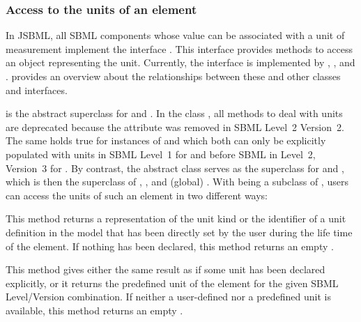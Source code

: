 \subsubsection{Access to the units of an element}

In JSBML, all SBML components whose value can be associated with a unit of
measurement implement the interface \SBaseWithUnit.  This interface provides
methods to access an object representing the unit. Currently, the interface
is implemented by \AbstractNamedSBaseWithUnit, \ExplicitRule, and
\KineticLaw.   provides an overview about the
relationships between these and other classes and interfaces.


\AbstractNamedSBaseWithUnit is the abstract superclass for \Event and
\QuantityWithUnit.  In the class \Event, all methods to deal with units are
deprecated because the  attribute was removed in SBML
Level~2 Version~2. The same holds true for instances of
\ExplicitRule and \KineticLaw which both can only be explicitly populated
with units in SBML Level~1 for \ExplicitRule and before
SBML in Level~2, Version~3 for \KineticLaw. By
contrast, the abstract class \QuantityWithUnit serves as the superclass for
\LocalParameter and \Symbol, which is then the superclass of \Compartment,
\Species, and (global) \Parameter.  With \SBaseWithUnit being a subclass of
\SBaseWithDerivedUnit, users can access the units of such an element in two
different ways:

\begin{description}[font=\normalfont]

\item[\code{getUnit()}:] This method returns a \String representation of
  the unit kind or the identifier of a unit definition in the model  that has
  been directly set by the user during the life time of the element. If
  nothing has been declared, this method returns an empty \String.

\item[\code{getDerivedUnit()}:] This method gives either the same
  result as   if some unit has
  been declared explicitly, or it returns the predefined unit of the
  element for the given SBML Level/Version combination.  If neither a
  user-defined nor a predefined unit is available, this method returns an
   empty \String.

\end{description}

